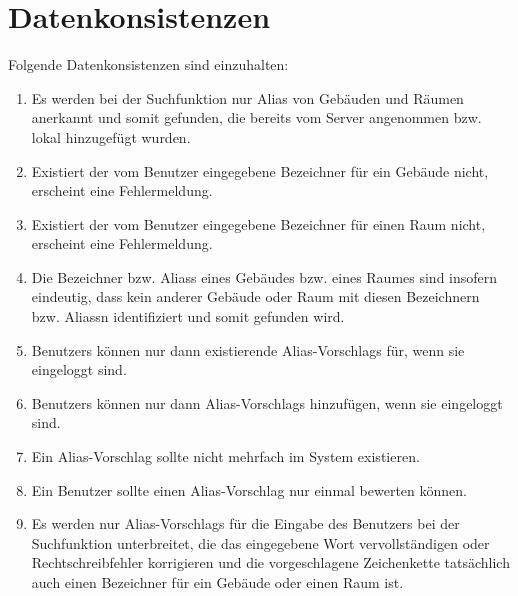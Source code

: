 \section{Datenkonsistenzen}

Folgende Datenkonsistenzen sind einzuhalten:
\begin{enumerate}[label=\textbf{/T\arabic*0/}, align=left, resume]
	\item Es werden bei der Suchfunktion nur \Gls{Alias} von Gebäuden und Räumen anerkannt und somit gefunden, die bereits vom \Gls{Server} angenommen bzw. lokal hinzugefügt wurden.
	\item Existiert der vom \Gls{Benutzer} eingegebene Bezeichner für ein Gebäude nicht, erscheint eine Fehlermeldung.
	\item Existiert der vom \Gls{Benutzer} eingegebene Bezeichner für einen Raum nicht, erscheint eine Fehlermeldung.
	\item Die Bezeichner bzw. \Glspl{Alias} eines Gebäudes bzw. eines Raumes sind insofern eindeutig, dass kein anderer Gebäude oder Raum mit diesen Bezeichnern bzw. \Glspl{Alias}n identifiziert und somit gefunden wird.
	\item \Glspl{Benutzer} können nur dann existierende \Glspl{Alias-Vorschlag} für, wenn sie eingeloggt sind.
	\item \Glspl{Benutzer} können nur dann \Glspl{Alias-Vorschlag} hinzufügen, wenn sie eingeloggt sind.
	\item Ein \Gls{Alias-Vorschlag} sollte nicht mehrfach im System existieren.
	\item Ein \Gls{Benutzer} sollte einen \Gls{Alias-Vorschlag} nur einmal bewerten können.
	\item Es werden nur \Glspl{Alias-Vorschlag} für die Eingabe des \Gls{Benutzer}s bei der Suchfunktion unterbreitet, die das eingegebene Wort vervollständigen oder Rechtschreibfehler korrigieren und die vorgeschlagene Zeichenkette tatsächlich auch einen Bezeichner für ein Gebäude oder einen Raum ist.
\end{enumerate}